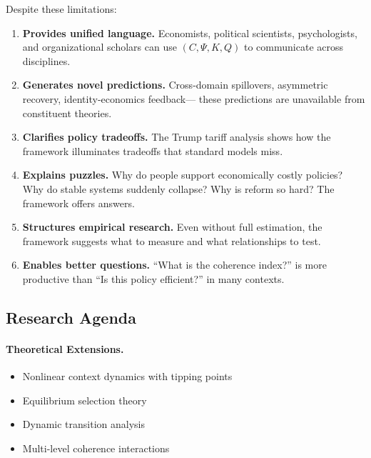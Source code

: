 \documentclass[12pt,a4paper]{article}
\begin{document}
Despite these limitations:

\begin{enumerate}
  \item \textbf{Provides unified language.}
        Economists, political scientists, psychologists, and organizational scholars
        can use $(C, \Psi, K, Q)$ to communicate across disciplines.
  
  \item \textbf{Generates novel predictions.}
        Cross-domain spillovers, asymmetric recovery, identity-economics feedback---
        these predictions are unavailable from constituent theories.
  
  \item \textbf{Clarifies policy tradeoffs.}
        The Trump tariff analysis shows how the framework illuminates
        tradeoffs that standard models miss.
  
  \item \textbf{Explains puzzles.}
        Why do people support economically costly policies?
        Why do stable systems suddenly collapse?
        Why is reform so hard? The framework offers answers.
  
  \item \textbf{Structures empirical research.}
        Even without full estimation, the framework suggests
        what to measure and what relationships to test.
  
  \item \textbf{Enables better questions.}
        ``What is the coherence index?'' is more productive than
        ``Is this policy efficient?'' in many contexts.
\end{enumerate}

\subsection{Research Agenda}

\paragraph{Theoretical Extensions.}
\begin{itemize}
  \item Nonlinear context dynamics with tipping points
  \item Equilibrium selection theory
  \item Dynamic transition analysis
  \item Multi-level coherence interactions
\end{itemize}
\end{document}

